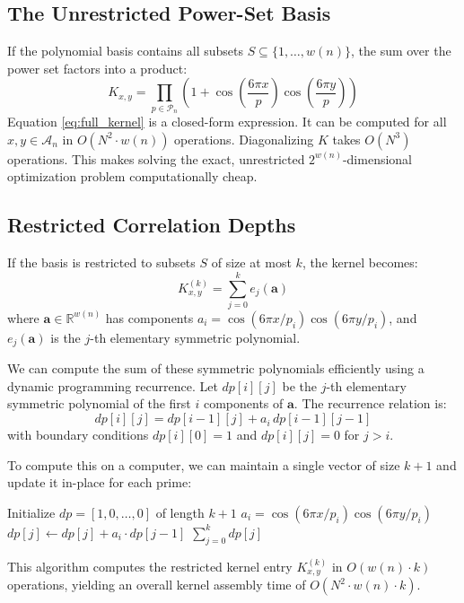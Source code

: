 \documentclass[10pt,twoside]{article}
\newcommand{\mathcalA}{\mathcal{A}}
\begin{document}
\subsection{The Unrestricted Power-Set Basis}
If the polynomial basis contains all subsets $S \subseteq \{1, \dots, w(n)\}$, the sum over the power set factors into a product:
\begin{equation} \label{eq:full_kernel}
K_{x, y} = \prod_{p \in \mathcal{P}_n} \left( 1 + \cos\left(\frac{6\pi x}{p}\right) \cos\left(\frac{6\pi y}{p}\right) \right)
\end{equation}
Equation \eqref{eq:full_kernel} is a closed-form expression. It can be computed for all $x, y \in \mathcalA_n$ in $O(N^2 \cdot w(n))$ operations. Diagonalizing $K$ takes $O(N^3)$ operations. This makes solving the exact, unrestricted $2^{w(n)}$-dimensional optimization problem computationally cheap.

\subsection{Restricted Correlation Depths}
If the basis is restricted to subsets $S$ of size at most $k$, the kernel becomes:
\begin{equation}
K^{(k)}_{x, y} = \sum_{j=0}^k e_j(\mathbf{a})
\end{equation}
where $\mathbf{a} \in \mathbb{R}^{w(n)}$ has components $a_i = \cos(6\pi x / p_i) \cos(6\pi y / p_i)$, and $e_j(\mathbf{a})$ is the $j$-th elementary symmetric polynomial.

We can compute the sum of these symmetric polynomials efficiently using a dynamic programming recurrence. Let $dp[i][j]$ be the $j$-th elementary symmetric polynomial of the first $i$ components of $\mathbf{a}$. The recurrence relation is:
\begin{equation}
dp[i][j] = dp[i-1][j] + a_i \, dp[i-1][j-1]
\end{equation}
with boundary conditions $dp[i][0] = 1$ and $dp[i][j] = 0$ for $j > i$.

To compute this on a computer, we can maintain a single vector of size $k+1$ and update it in-place for each prime:
\begin{algorithmic}
\State Initialize $dp = [1, 0, \dots, 0]$ of length $k+1$
    \State $a_i = \cos(6\pi x / p_i) \cos(6\pi y / p_i)$
        \State $dp[j] \gets dp[j] + a_i \cdot dp[j-1]$
    \EndFor
\EndFor
\State \Return $\sum_{j=0}^k dp[j]$
\end{algorithmic}
This algorithm computes the restricted kernel entry $K^{(k)}_{x, y}$ in $O(w(n) \cdot k)$ operations, yielding an overall kernel assembly time of $O(N^2 \cdot w(n) \cdot k)$.
\end{document}

